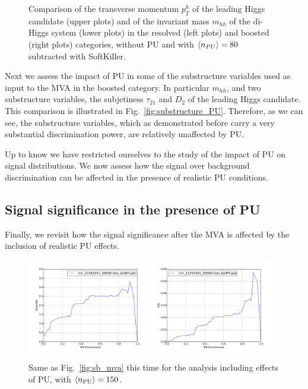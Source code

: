 \begin{figure}[t]
\begin{center}
  \caption{\small
    Comparison of the transverse momentum $p_T^h$ of the leading
    Higgs candidate (upper plots) and of the invariant mass $m_{hh}$
    of the di-Higgs system (lower plots) in the resolved
    (left plots) and boosted (right plots) categories,
    without PU and with $\left\langle n_{PU}\right\rangle=80$ subtracted with SoftKiller.
}
\label{fig:mHH_PU}
\end{center}
\end{figure}

Next we assess the impact of PU in some of the substructure variables
used as input to the MVA in the boosted category.
%
In particular $m_{hh}$, and two substructure variables, the subjetiness
$\tau_{21}$ and $D_2$ of the leading Higgs candidate.
%
This comparison is illustrated in Fig.~\ref{fig:substructure_PU}.
%
Therefore, as we can see, the substructure variables, which
as demonstrated before carry a very substantial
discrimination power, are relatively unaffected by PU.



Up to know we have restricted ourselves to the study of the impact of PU
on signal distributions.
%
We now assess how the signal over background discrimination can be affected
in the presence of realistic PU conditions.

\subsection{Signal significance in the presence of PU}

Finally, we revisit how the signal significance after the MVA
is affected by the inclusion of realistic PU effects.


\begin{figure}[t]
\begin{center}
\includegraphics[width=0.48\textwidth]{plots/ssb_pu.pdf}
\includegraphics[width=0.48\textwidth]{plots/sb_pu.pdf}
\caption{\small
  Same as Fig.~\ref{fig:sb_mva} this time for the analysis including
  effects of PU, with $\left\langle n_{\rm PU}\right\rangle=150$.
}
\label{fig:sb_mva_pu}
\end{center}
\end{figure}

